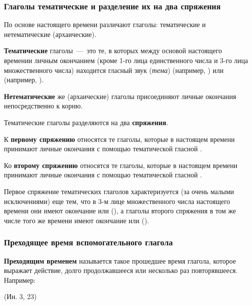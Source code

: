 \documentclass[11pt,a4paper,oneside]{memoir}
\begin{document}
    \bigskip{}
                \subsubsection{Глаголы тематические и разделение их на два спряжения}

    По основе настоящего времени различают глаголы: тематические и нетематические (архаические).
    
    \textbf{Тематические} глаголы~---~это те, в которых между основой настоящего времении личным окончанием (кроме 1-го лица единственного числа и 3-го лица множественного числа) находится гласный звук (\emph{тема}) {} (например, {}) или {} (например, {}).
    
    \textbf{Нетематические} же (архаические) глаголы присоединяют личные окончания непосредственно к корню.
    
    Тематические глаголы разделяются на два \textbf{спряжения}.
    
    К \textbf{первому спряжению} относятся те глаголы, которые в настоящем времени принимают личные окончания с помощью тематической гласной {}.
    
    Ко \textbf{второму спряжению} относятся те глаголы, которые в настоящем времени принимают личные окончания с помощью тематической гласной {}.
    
    Первое спряжение тематических глаголов характеризуется (за очень малыми исключениями) еще тем, что в 3-м лице множественного числа настоящего времени они имеют окончание {} или {} ({}), а глаголы второго спряжения в том же числе того же времени имеют окончание {} или {} ({}).

                \subsubsection{Преходящее время вспомогательного глагола {}}

    \textbf{Преходящим временем} называется такое прошедшее время глагола, которое выражает действие, долго продолжавшееся или несколько раз повторявшееся. Например:
    
    {} (Ин. 3, 23)
    
\end{document}

